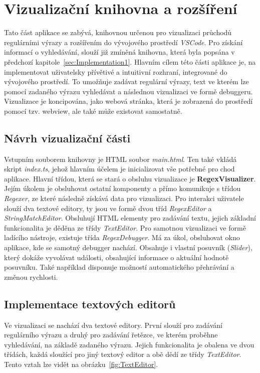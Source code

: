\chapter{Vizualizační knihovna a rozšíření}\label{sec:Implementation2}

Tato část aplikace se zabývá, knihovnou určenou pro vizualizaci průchodů regulárními výrazy a rozšířením do vývojového prostředí \textit{VSCode}.
Pro získání informací o vyhledávání, slouží již zmíněná knihovna, která byla popsána v předchozí kapitole~\ref{sec:Implementation1}.
Hlavním cílem této části aplikace je, na implementovat uživatelsky přívětivé a intuitivní rozhraní, integrované do vývojového prostředí.
To umožňuje zadávat regulární výrazy, text ve kterém lze pomocí zadaného výrazu vyhledávat a následnou vizualizaci ve formě debuggeru.
Vizualizace je koncipována, jako webová stránka, která je zobrazená do prostředí pomocí tzv. webview, ale také může existovat samostatně.

\section{Návrh vizualizační části}

Vstupním souborem knihovny je HTML soubor \textit{main.html}.
Ten také vkládá skript \textit{index.ts}, jehož hlavním účelem je inicializovat vše potřebné pro chod aplikace.
Hlavní třídou, která se stará o obsluhu vizualizace je \textbf{RegexVisualizer}. 
Jejím úkolem je obsluhovat ostatní komponenty a přímo komunikuje s třídou \textit{Regexer}, ze které následně získává data pro vizualizaci.
Pro interakci uživatele slouží dva textové editory, ty jsou ve formě dvou tříd \textit{RegexEditor} a \textit{StringMatchEditor}.
Obsluhují HTML elementy pro zadávání textu, jejich základní funkcionalita je děděna ze třídy \textit{TextEditor}.
Pro samotnou vizualizaci ve formě ladícího nástroje, existuje třída \textit{RegexDebugger}.
Má za úkol, obsluhovat okno aplikace, kde se samotný debugger nachází.
Obsahuje i vlastní posuvník (\textit{Slider}), který dokáže vyvolávat události, obsahující informace o aktuální hodnotě posuvníku.
Také například disponuje možností automatického přehrávání a změnou rychlosti.

\section{Implementace textových editorů}

Ve vizualizaci se nachází dva textové editory.
První slouží pro zadávání regulárního výrazu a druhý pro zadávání řetězce, ve kterém proběhne vyhledávání, na základě zadaného výrazu.
Jejich funkcionalita je obalena ve dvou třídách, každá sloužící pro jiný textový editor a obě dědí ze třídy \textit{TextEditor}.
Tento vztah lze vidět na obrázku~\ref{fig:TextEditor}.

